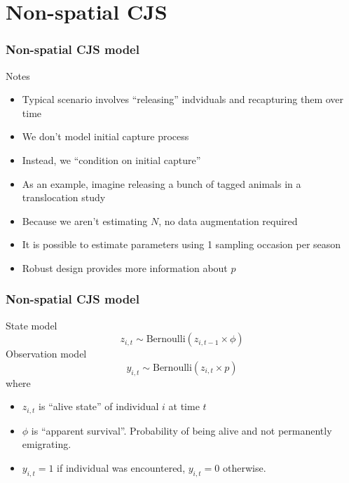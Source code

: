 \documentclass[color=usenames,dvipsnames]{beamer}\usepackage[]{graphicx}\usepackage[]{color}
\begin{document}
\section{Non-spatial CJS}







\begin{frame}
  \frametitle{Non-spatial CJS model}
  \large
  Notes
  \begin{itemize}[<+->]
    \normalsize
    \item Typical scenario involves ``releasing'' indviduals and recapturing them over time
    \item We don't model initial capture process
    \item Instead, we ``condition on initial capture''
    \item As an example, imagine releasing a bunch of tagged animals
      in a translocation study
    \item Because we aren't estimating $N$, no data augmentation required
    \item It is possible to estimate parameters using 1 sampling occasion per season
    \item Robust design provides more information about $p$
  \end{itemize}
\end{frame}




\begin{frame}
  \frametitle{Non-spatial CJS model}
  State model
  \[
    z_{i,t} \sim \mbox{Bernoulli}(z_{i,t-1} \times \phi)
  \]
  \vfill
  Observation model
  \[
    y_{i,t} \sim \mbox{Bernoulli}(z_{i,t} \times p)
  \]
  \pause
  \vfill
  \small
  where
  \begin{itemize}
    \item $z_{i,t}$ is ``alive state'' of individual $i$ at time $t$
    \item $\phi$ is ``apparent survival''. Probability of being alive
      and not permanently emigrating. 
    \item $y_{i,t}=1$ if individual was encountered, $y_{i,t}=0$ otherwise.
  \end{itemize}
\end{frame}
\end{document}
